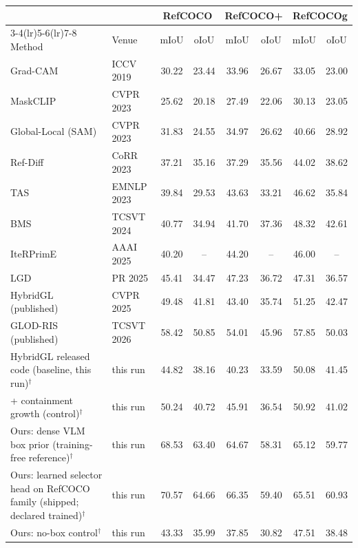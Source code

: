 \begin{tabular}{llcccccc}
\toprule
 & & \multicolumn{2}{c}{RefCOCO} & \multicolumn{2}{c}{RefCOCO+} & \multicolumn{2}{c}{RefCOCOg} \\
\cmidrule(lr){3-4}\cmidrule(lr){5-6}\cmidrule(lr){7-8}
Method & Venue & mIoU & oIoU & mIoU & oIoU & mIoU & oIoU \\
\midrule
Grad-CAM & ICCV 2019 & 30.22 & 23.44 & 33.96 & 26.67 & 33.05 & 23.00 \\
MaskCLIP & CVPR 2023 & 25.62 & 20.18 & 27.49 & 22.06 & 30.13 & 23.05 \\
Global-Local (SAM) & CVPR 2023 & 31.83 & 24.55 & 34.97 & 26.62 & 40.66 & 28.92 \\
Ref-Diff & CoRR 2023 & 37.21 & 35.16 & 37.29 & 35.56 & 44.02 & 38.62 \\
TAS & EMNLP 2023 & 39.84 & 29.53 & 43.63 & 33.21 & 46.62 & 35.84 \\
BMS & TCSVT 2024 & 40.77 & 34.94 & 41.70 & 37.36 & 48.32 & 42.61 \\
IteRPrimE & AAAI 2025 & 40.20 & -- & 44.20 & -- & 46.00 & -- \\
LGD & PR 2025 & 45.41 & 34.47 & 47.23 & 36.72 & 47.31 & 36.57 \\
HybridGL (published) & CVPR 2025 & 49.48 & 41.81 & 43.40 & 35.74 & 51.25 & 42.47 \\
GLOD-RIS (published) & TCSVT 2026 & 58.42 & 50.85 & 54.01 & 45.96 & 57.85 & 50.03 \\
HybridGL released code (baseline, this run)$^\dagger$ & this run & 44.82 & 38.16 & 40.23 & 33.59 & 50.08 & 41.45 \\
+ containment growth (control)$^\dagger$ & this run & 50.24 & 40.72 & 45.91 & 36.54 & 50.92 & 41.02 \\
Ours: dense VLM box prior (training-free reference)$^\dagger$ & this run & 68.53 & 63.40 & 64.67 & 58.31 & 65.12 & 59.77 \\
Ours: learned selector head on RefCOCO family (shipped; declared trained)$^\dagger$ & this run & 70.57 & 64.66 & 66.35 & 59.40 & 65.51 & 60.93 \\
Ours: no-box control$^\dagger$ & this run & 43.33 & 35.99 & 37.85 & 30.82 & 47.51 & 38.48 \\
\bottomrule
\end{tabular}
